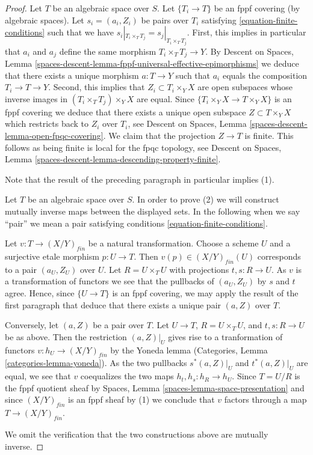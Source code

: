 \begin{proof}
Let $T$ be an algebraic space over $S$.
Let $\{T_i \to T\}$ be an fppf covering (by algebraic spaces).
Let $s_i = (a_i, Z_i)$ be pairs over $T_i$
satisfying \ref{equation-finite-conditions}
such that we have $s_i|_{T_i \times_T T_j} = s_j|_{T_i \times_T T_j}$.
First, this implies in particular that $a_i$ and $a_j$ define the same
morphism $T_i \times_T T_j \to Y$. By
Descent on Spaces,
Lemma \ref{spaces-descent-lemma-fppf-universal-effective-epimorphisms}
we deduce that there exists a unique morphism $a : T \to Y$
such that $a_i$ equals the composition $T_i \to T \to Y$.
Second, this implies that $Z_i \subset T_i \times_Y X$ are open subspaces
whose inverse images in $(T_i \times_T T_j) \times_Y X$ are equal.
Since $\{T_i \times_Y X \to T \times_Y X\}$ is an fppf covering
we deduce that there exists a unique open subspace $Z \subset T \times_Y X$
which restricts back to $Z_i$ over $T_i$, see
Descent on Spaces, Lemma \ref{spaces-descent-lemma-open-fpqc-covering}.
We claim that the projection $Z \to T$ is finite.
This follows as being finite is local for the fpqc topology, see
Descent on Spaces, Lemma \ref{spaces-descent-lemma-descending-property-finite}.

\medskip\noindent
Note that the result of the preceding paragraph in particular implies (1).

\medskip\noindent
Let $T$ be an algebraic space over $S$. In order to prove (2) we will
construct mutually inverse maps between the displayed sets. In the
following when we say ``pair'' we mean a pair satisfying
conditions \ref{equation-finite-conditions}.

\medskip\noindent
Let $v : T \to (X/Y)_{fin}$ be a natural transformation.
Choose a scheme $U$ and a surjective etale morphism $p : U \to T$.
Then $v(p) \in (X/Y)_{fin}(U)$ corresponds to a pair $(a_U, Z_U)$
over $U$. Let $R = U \times_T U$ with projections $t, s : R \to U$.
As $v$ is a transformation of functors we see that the pullbacks of
$(a_U, Z_U)$ by $s$ and $t$ agree. Hence, since $\{U \to T\}$ is an
fppf covering, we may apply the result of the first paragraph that
deduce that there exists a unique pair $(a, Z)$ over $T$.

\medskip\noindent
Conversely, let $(a, Z)$ be a pair over $T$. 
Let $U \to T$, $R = U \times_T U$, and $t, s : R \to U$ be as
above. Then the restriction $(a, Z)|_U$ gives rise to a
tranformation of functors $v : h_U \to (X/Y)_{fin}$ by the
Yoneda lemma
(Categories, Lemma \ref{categories-lemma-yoneda}).
As the two pullbacks $s^*(a, Z)|_U$ and $t^*(a, Z)|_U$
are equal, we see that $v$ coequalizes the two maps
$h_t, h_s : h_R \to h_U$. Since $T = U/R$ is the fppf quotient sheaf by
Spaces, Lemma \ref{spaces-lemma-space-presentation}
and since $(X/Y)_{fin}$ is an fppf sheaf by (1) we conclude
that $v$ factors through a map $T \to (X/Y)_{fin}$.

\medskip\noindent
We omit the verification that the two constructions above are mutually
inverse.
\end{proof}

